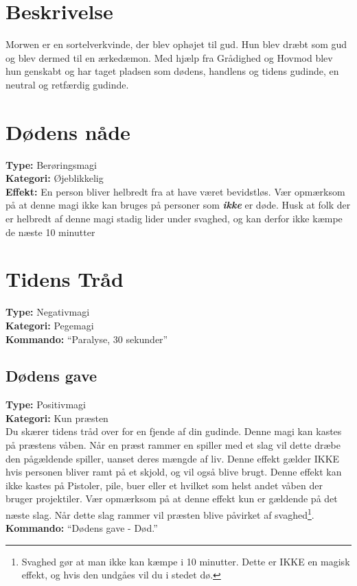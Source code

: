\section{Beskrivelse}
Morwen er en sortelverkvinde, der blev ophøjet til gud. Hun blev dræbt som gud og blev dermed til en ærkedæmon. Med hjælp fra Grådighed og Hovmod blev hun genskabt og har taget pladsen som dødens, handlens og tidens gudinde, en neutral og retfærdig gudinde.\\

\section{Dødens nåde}
\textbf{Type:} Berøringsmagi\\
\textbf{Kategori:} Øjeblikkelig\\
\textbf{Effekt:} En person bliver helbredt fra at have været bevidstløs. Vær opmærksom på at denne magi ikke kan bruges på personer som \textbf{\textit{ikke}} er døde. Husk at folk der er helbredt af denne magi stadig lider under svaghed, og kan derfor ikke kæmpe de næste 10 minutter

\section{Tidens Tråd}
\textbf{Type:} Negativmagi\\
\textbf{Kategori:} Pegemagi\\
\textbf{Kommando:} “Paralyse, 30 sekunder”

\subsection{Dødens gave}
\textbf{Type:} Positivmagi\\
\textbf{Kategori:} Kun præsten\\
Du skærer tidens tråd over for en fjende af din gudinde. Denne magi kan kastes på præstens våben. Når en præst rammer en spiller med et slag vil dette dræbe den pågældende spiller, uanset deres mængde af liv.
Denne effekt gælder IKKE hvis personen bliver ramt på et skjold, og vil også blive brugt. Denne effekt kan ikke kastes på Pistoler, pile, buer eller et hvilket som helst andet våben der bruger projektiler. Vær opmærksom på at denne effekt kun er gældende på det næste slag. Når dette slag rammer vil præsten blive påvirket af svaghed\footnote{Svaghed gør at man ikke kan kæmpe i 10 minutter. Dette er IKKE en magisk effekt, og hvis den undgåes vil du i stedet dø.}.\\
\textbf{Kommando:} “Dødens gave - Død.”

